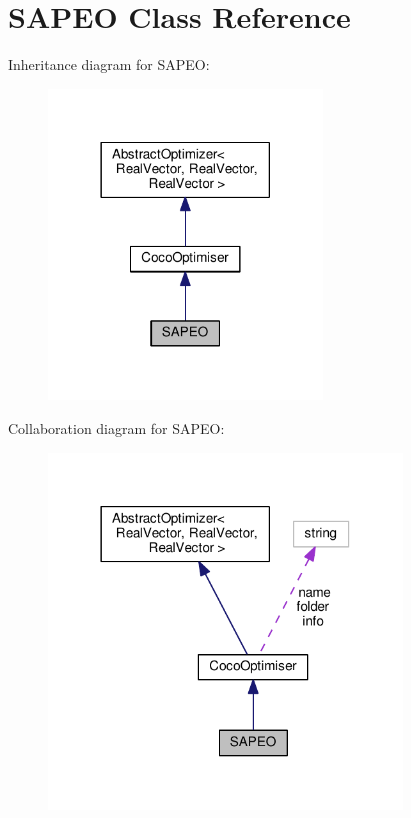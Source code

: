 \hypertarget{classSAPEO}{}\section{S\+A\+P\+EO Class Reference}
\label{classSAPEO}


Inheritance diagram for S\+A\+P\+EO\+:\nopagebreak
\begin{figure}[H]
\begin{center}
\leavevmode
\includegraphics[width=206pt]{classSAPEO__inherit__graph}
\end{center}
\end{figure}


Collaboration diagram for S\+A\+P\+EO\+:\nopagebreak
\begin{figure}[H]
\begin{center}
\leavevmode
\includegraphics[width=266pt]{classSAPEO__coll__graph}
\end{center}
\end{figure}
